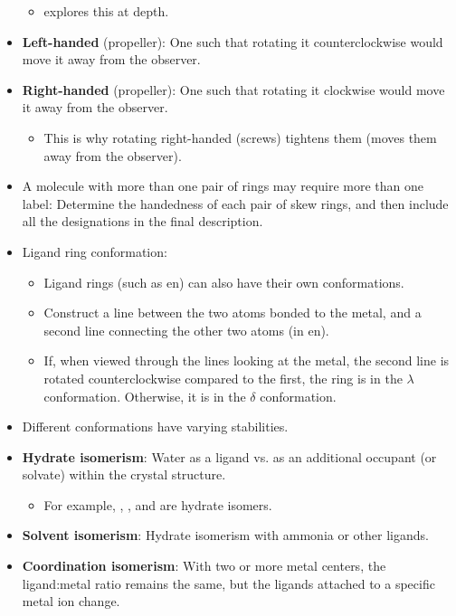 \documentclass[../notes.tex]{subfiles}
\begin{document}
\begin{itemize}
    \begin{itemize}
        \item \textcite{bib:MiesslerFischerTarr} explores this at depth.
    \end{itemize}
    \item \textbf{Left-handed} (propeller): One such that rotating it counterclockwise would move it away from the observer.
    \item \textbf{Right-handed} (propeller): One such that rotating it clockwise would move it away from the observer.
    \begin{itemize}
        \item This is why rotating right-handed (screws) tightens them (moves them away from the observer).
    \end{itemize}
    \item A molecule with more than one pair of rings may require more than one label: Determine the handedness of each pair of skew rings, and then include all the designations in the final description.
    \item Ligand ring conformation:
    \begin{itemize}
        \item Ligand rings (such as en) can also have their own conformations.
        \item Construct a line between the two atoms bonded to the metal, and a second line connecting the other two atoms (in en).
        \item If, when viewed through the lines looking at the metal, the second line is rotated counterclockwise compared to the first, the ring is in the $\lambda$ conformation. Otherwise, it is in the $\delta$ conformation.
    \end{itemize}
    \item Different conformations have varying stabilities.
    \item \textbf{Hydrate isomerism}: Water as a ligand vs. as an additional occupant (or solvate) within the crystal structure.
    \begin{itemize}
        \item For example, , , and  are hydrate isomers.
    \end{itemize}
    \item \textbf{Solvent isomerism}: Hydrate isomerism with ammonia or other ligands.
    \item \textbf{Coordination isomerism}: With two or more metal centers, the ligand:metal ratio remains the same, but the ligands attached to a specific metal ion change.

\end{itemize}
\end{document}
